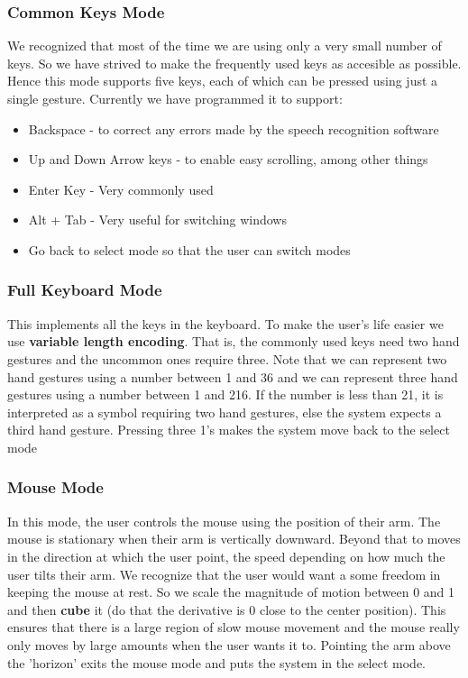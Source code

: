 \documentclass[12pt]{article}
\begin{document}
\subsubsection{Common Keys Mode}
We recognized that most of the time we are using only a very small number of keys. So we have strived to make the frequently used keys as accesible as possible. Hence this mode supports five keys, each of which can be pressed using just a single gesture. Currently we have programmed it to support:
\begin{itemize}
  \item Backspace - to correct any errors made by the speech recognition software
  \item Up and Down Arrow keys - to enable easy scrolling, among other things
  \item Enter Key - Very commonly used
  \item Alt + Tab - Very useful for switching windows
  \item Go back to select mode so that the user can switch modes
\end{itemize}

\subsubsection{Full Keyboard Mode}
This implements all the keys in the keyboard. To make the user's life easier we use {\bf variable length encoding}. That is, the commonly used keys need two hand gestures and the uncommon ones require three. Note that we can represent two hand gestures using a number between 1 and 36 and we can represent three hand gestures using a number between 1 and 216. If the number is less than 21, it is interpreted as a symbol requiring two hand gestures, else the system expects a third hand gesture. Pressing three 1's makes the system move back to the select mode

\subsubsection{Mouse Mode}
In this mode, the user controls the mouse using the position of their arm. The mouse is stationary when their arm is vertically downward. Beyond that to moves in the direction at which the user point, the speed depending on how much the user tilts their arm. We recognize that the user would want a some freedom in keeping the mouse at rest. So we scale the magnitude of motion between 0 and 1 and then {\bf cube} it (do that the derivative is 0 close to the center position). This ensures that there is a large region of slow mouse movement and the mouse really only moves by large amounts when the user wants it to. Pointing the arm above the 'horizon' exits the mouse mode and puts the system in the select mode.
\end{document}
